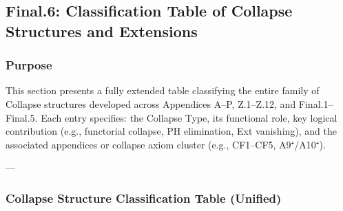\documentclass[11pt]{article}
\begin{document}
\begin{axiom}
\begin{axiom}
{{\subsection*{Final.6: Classification Table of Collapse Structures and Extensions}

\subsubsection*{Purpose}

This section presents a fully extended table classifying  
the entire family of Collapse structures developed across Appendices A–P, Z.1–Z.12, and Final.1–Final.5.  
Each entry specifies: the Collapse Type, its functional role, key logical contribution (e.g., functorial collapse, PH elimination, Ext vanishing),  
and the associated appendices or collapse axiom cluster (e.g., CF1–CF5, A9⁺/A10⁺).

---

\subsubsection*{Collapse Structure Classification Table (Unified)}

}}
\end{axiom}
\end{axiom}
\end{document}
